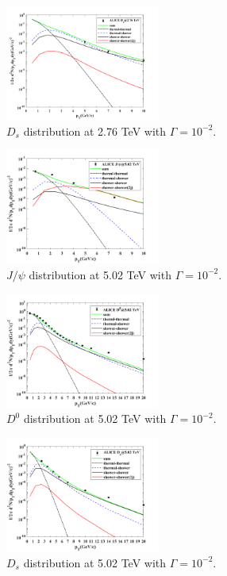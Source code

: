 \documentclass[twocolumn,aps,superscriptaddress,nofootinbib,floatfix]{revtex4}
\begin{document}
\begin{figure}[H]
	\includegraphics[width=0.45\textwidth]{Ds276_230223.png}
	\caption{$D_s$ distribution at 2.76 TeV with $\Gamma=10^{-2}$. }
	\label{fig60}
\end{figure}
\begin{figure}[H]
	\includegraphics[width=0.45\textwidth]{Jpsi502_230223.png}
	\caption{$J/\psi$ distribution at 5.02 TeV with $\Gamma=10^{-2}$. }
	\label{fig61}
\end{figure}
\begin{figure}[H]
	\includegraphics[width=0.45\textwidth]{D0502_230223.png}
	\caption{$D^0$ distribution at 5.02 TeV with $\Gamma=10^{-2}$. }
	\label{fig62}
\end{figure}
\begin{figure}[H]
	\includegraphics[width=0.45\textwidth]{Ds502_230223.png}
	\caption{$D_s$ distribution at 5.02 TeV with $\Gamma=10^{-2}$. }
	\label{fig63}
\end{figure}
\end{document}
